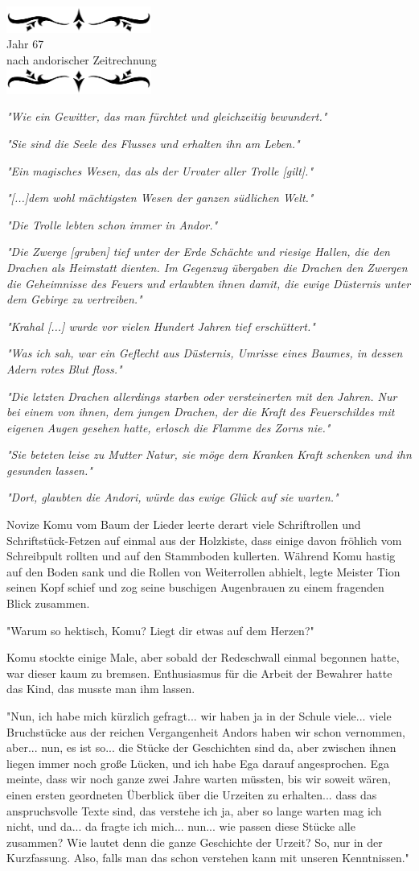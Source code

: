 \documentclass[10pt, a4paper, oneside]{book}
\newcommand{\az}[1]{%
    \begin{center}
        \includegraphics[width=180px]{Das Erbe des Wunderkindes/verzierung1.png}\\
        {\Huge #1} \\
        {nach andorischer Zeitrechnung}\\
        \includegraphics[width=180px]{Das Erbe des Wunderkindes/verzierung2.png}
    \end{center}
    \extramarks{}{#1 a.Z.}
}
\begin{document}
\az{Jahr 67}

\textit{"Wie ein Gewitter, das man fürchtet und gleichzeitig bewundert."}

\textit{"Sie sind die Seele des Flusses und erhalten ihn am Leben."}

\textit{"Ein magisches Wesen, das als der Urvater aller Trolle [gilt]."}

\textit{"[...]dem wohl mächtigsten Wesen der ganzen südlichen Welt."}

\textit{"Die Trolle lebten schon immer in Andor."}

\textit{"Die Zwerge [gruben] tief unter der Erde Schächte und riesige Hallen, die den Drachen als Heimstatt dienten. Im Gegenzug übergaben die Drachen den Zwergen die Geheimnisse des Feuers und erlaubten ihnen damit, die ewige Düsternis unter dem Gebirge zu vertreiben."}

\textit{"Krahal [...] wurde vor vielen Hundert Jahren tief erschüttert."}

\textit{"Was ich sah, war ein Geflecht aus Düsternis, Umrisse eines Baumes, in dessen Adern rotes Blut floss."}

\textit{"Die letzten Drachen allerdings starben oder versteinerten mit den Jahren. Nur bei einem von ihnen, dem jungen Drachen, der die Kraft des Feuerschildes mit eigenen Augen gesehen hatte, erlosch die Flamme des Zorns nie."}

\textit{"Sie beteten leise zu Mutter Natur, sie möge dem Kranken Kraft schenken und ihn gesunden lassen."}

\textit{"Dort, glaubten die Andori, würde das ewige Glück auf sie warten."}\bigskip

Novize Komu vom Baum der Lieder leerte derart viele Schriftrollen und Schriftstück-Fetzen auf einmal aus der Holzkiste, dass einige davon fröhlich vom Schreibpult rollten und auf den Stammboden kullerten. Während Komu hastig auf den Boden sank und die Rollen von Weiterrollen abhielt, legte Meister Tion seinen Kopf schief und zog seine buschigen Augenbrauen zu einem fragenden Blick zusammen.

"Warum so hektisch, Komu? Liegt dir etwas auf dem Herzen?"

Komu stockte einige Male, aber sobald der Redeschwall einmal begonnen hatte, war dieser kaum zu bremsen. Enthusiasmus für die Arbeit der Bewahrer hatte das Kind, das musste man ihm lassen.

"Nun, ich habe mich kürzlich gefragt... wir haben ja in der Schule viele... viele Bruchstücke aus der reichen Vergangenheit Andors haben wir schon vernommen, aber... nun, es ist so... die Stücke der Geschichten sind da, aber zwischen ihnen liegen immer noch große Lücken, und ich habe Ega darauf angesprochen. Ega meinte, dass wir noch ganze zwei Jahre warten müssten, bis wir soweit wären, einen ersten geordneten Überblick über die Urzeiten zu erhalten... dass das anspruchsvolle Texte sind, das verstehe ich ja, aber so lange warten mag ich nicht, und da... da fragte ich mich... nun... wie passen diese Stücke alle zusammen? Wie lautet denn die ganze Geschichte der Urzeit? So, nur in der Kurzfassung. Also, falls man das schon verstehen kann mit unseren Kenntnissen."
\end{document}
